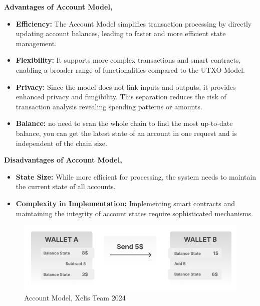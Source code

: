 \documentclass[10pt,a4paper,twocolumn]{article}
\begin{document}
\textbf{Advantages of Account Model,} \\
\begin{itemize}
\item \textbf{Efficiency:} The Account Model simplifies transaction processing by directly updating account balances, leading to faster and more efficient state management.\\

\item \textbf{Flexibility:} It supports more complex transactions and smart contracts, enabling a broader range of functionalities compared to the UTXO Model.\\

\item \textbf{Privacy:} Since the model does not link inputs and outputs, it provides enhanced privacy and fungibility. This separation reduces the risk of transaction analysis revealing spending patterns or amounts.\\

\item \textbf{Balance:} no need to scan the whole chain to find the most up-to-date balance, you can get the latest state of an account in one request and is independent of the chain size.\\
\end{itemize}

\textbf{Disadvantages of Account Model,} \\
\begin{itemize}
\item \textbf{State Size:} While more efficient for processing, the system needs to maintain the current state of all accounts. 

\item \textbf{Complexity in Implementation:} Implementing smart contracts and maintaining the integrity of account states require sophisticated mechanisms.\\
\end{itemize}
\begin{figure}
    \centering
    \includegraphics[width=0.9\linewidth]{Frame 2.png}
    \caption{Account Model, Xelis Team 2024}
\end{figure}
\end{document}
